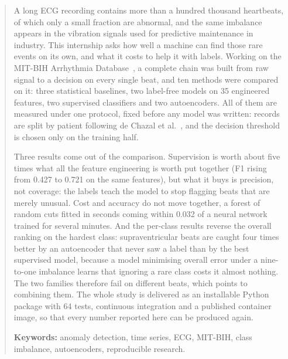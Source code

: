 \documentclass[a4paper, 12pt]{article}
\begin{document}
\begin{quote}
\small
A long ECG recording contains more than a hundred thousand heartbeats, of which
only a small fraction are abnormal, and the same imbalance appears in the
vibration signals used for predictive maintenance in industry. This internship
asks how well a machine can find those rare events on its own, and what it costs
to help it with labels. Working on the MIT-BIH Arrhythmia
Database~\cite{moody2001mitbih}, a complete chain was built from raw signal to a
decision on every single beat, and ten methods were compared on it: three
statistical baselines, two label-free models on 35 engineered features, two
supervised classifiers and two autoencoders. All of them are measured under one
protocol, fixed before any model was written: records are split by patient
following de Chazal et al.~\cite{dechazal2004}, and the decision threshold is
chosen only on the training half.

Three results come out of the comparison. Supervision is worth about five times
what all the feature engineering is worth put together (F1 rising from
\num{0.427} to \num{0.721} on the same features), but what it buys is precision,
not coverage: the labels teach the model to stop flagging beats that are merely
unusual. Cost and accuracy do not move together, a forest of random cuts fitted
in seconds coming within \num{0.032} of a neural network trained for several
minutes. And the per-class results reverse the overall ranking on the hardest
class: supraventricular beats are caught four times better by an autoencoder that
never saw a label than by the best supervised model, because a model minimising
overall error under a nine-to-one imbalance learns that ignoring a rare class
costs it almost nothing. The two families therefore fail on different beats,
which points to combining them. The whole study is delivered as an installable
Python package with 64 tests, continuous integration and a published container
image, so that every number reported here can be produced again.

\medskip
\noindent\textbf{Keywords:} anomaly detection, time series, ECG, MIT-BIH,
class imbalance, autoencoders, reproducible research.
\end{quote}
\end{document}
